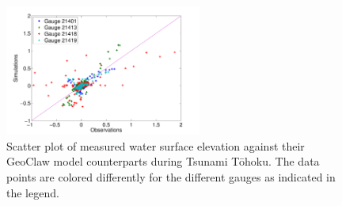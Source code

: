 \documentclass[review,12pt]{elsarticle}
\newcommand{\geoclaw}{{\sc GeoClaw}\xspace}
\newcommand{\tohoku}{T\={o}hoku\xspace}
\begin{document}
\begin{figure}[ht]
\centering
\includegraphics[width=0.575\textwidth]{Figure13.pdf} 
\caption{Scatter plot of measured water surface elevation against their \geoclaw
model counterparts during Tsunami \tohoku. The data points are colored 
differently for the different gauges as indicated in the legend. }
\label{fig:scatter}

\end{figure}  
\end{document}

